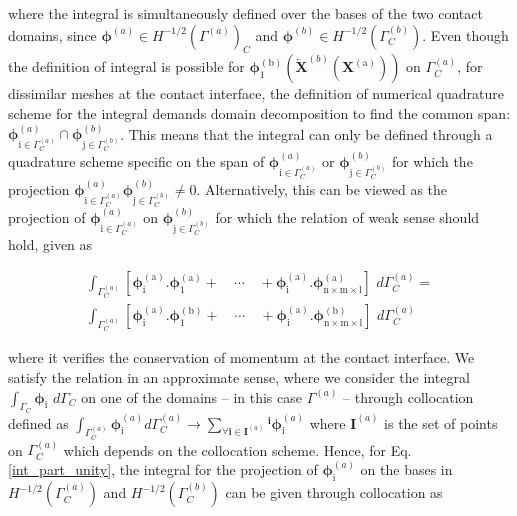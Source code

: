  where the integral is simultaneously defined over the bases of the two contact domains, since $\bm \phi^{(a)} \in H^{-1/2}(\Gamma^{(a)})_C$ and $\bm \phi^{(b)} \in H^{-1/2}(\Gamma^{(b)}_C)$.
 Even though the definition of integral is possible for $\bm  \phi^{\mathrm{(b)}}_{\mathrm{1}}(\overleftarrow{\bm X}^{(b)}(\bm X^{\mathrm{(a)}}))$ on $\Gamma_C^{(a)}$,
 for dissimilar meshes at the contact interface, the definition of numerical quadrature scheme for the integral demands domain decomposition to find the common span: $\bm \phi^{(a)}_{\mathrm{i}\in \Gamma_C^{(a)}}  \cap \bm \phi^{(b)}_{\mathrm{j}\in \Gamma_C^{(b)}}$. This means that the integral can only be defined through a quadrature scheme specific on the span of $\bm \phi^{(a)}_{\mathrm{i}\in \Gamma_C^{(a)}}$ or $\bm \phi^{(b)}_{\mathrm{j}\in \Gamma_C^{(b)}}$ for which the projection $\bm \phi^{(a)}_{\mathrm{i}\in \Gamma_C^{(a)}} \bm \phi^{(b)}_{\mathrm{j}\in \Gamma_C^{(b)}} \neq 0$. Alternatively, this can be viewed as the projection of $\bm \phi^{(a)}_{\mathrm{i}\in \Gamma_C^{(a)}} $ on $\bm \phi^{(b)}_{\mathrm{j}\in \Gamma_C^{(b)}}$ for which the relation of weak sense should hold, given as 

\begin{multline}\label{int_part_unity}
\int_{\Gamma^{(a)}_C} [\bm  \phi^{\mathrm{(a)}}_{\mathrm{i}}.\bm  \phi^{\mathrm{(a)}}_{\mathrm{1}} +\quad \cdots \quad  +\bm  \phi^{\mathrm{(a)}}_{\mathrm{i}}. \bm  \phi^{\mathrm{(a)}}_{\mathrm{n \times m \times l}}]\,\,d\Gamma^{(a)}_C =\\
 \int_{\Gamma^{(a)}_C} [\bm  \phi^{\mathrm{(a)}}_{\mathrm{i}}.\bm  \phi^{\mathrm{(b)}}_{\mathrm{1}} +\quad \cdots \quad  +\bm  \phi^{\mathrm{(a)}}_{\mathrm{i}}. \bm  \phi^{\mathrm{(b)}}_{\mathrm{n \times m \times l}} ] \,\,d\Gamma^{(a)}_C 
\end{multline}    
    
where it verifies the conservation of momentum at the contact interface. We satisfy the relation in an approximate sense, where we consider the integral $\int_{\Gamma_C} \bm \phi_{\mathrm i} \,\, d\Gamma_C$ on one of the domains -- in this case $\Gamma^{(a)}$ -- through collocation defined as  $\int_{\Gamma_C^{(a)}}  \bm \phi_{\mathrm i}^{(a)} d \Gamma_C^{(a)} \rightarrow \sum_{\forall \bm i \in \bm I^{(a)}} {}^{\bm i}\bm \phi_{\mathrm i}^{(a)}$ where $\bm I^{(a)}$ is the set of points on $\Gamma_C^{(a)}$ which depends on the collocation scheme. 
Hence, for Eq. \eqref{int_part_unity}, the integral for the projection of $\bm \phi_{\mathrm{i}}^{(a)}$ on the bases in $H^{-1/2}(\Gamma^{(a)}_C)$ and $H^{-1/2}(\Gamma^{(b)}_C)$ can be given through collocation as 

